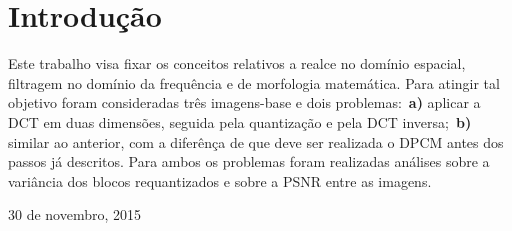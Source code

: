 \documentclass[conference]{Trabalho_3}
\begin{document}
\maketitle






%
\IEEEpeerreviewmaketitle


\section{Introdu\c{c}\~ao}
  \label{intro}
Este trabalho visa fixar os conceitos relativos a realce no dom\'inio espacial, filtragem no dom\'inio da frequ\^encia e de morfologia matem\'atica. Para atingir tal objetivo foram consideradas tr\^es imagens-base e dois problemas:~\textbf{a)} aplicar a DCT em duas dimens\~oes, seguida pela quantiza\c{c}\~ao e pela DCT inversa;~\textbf{b)} similar ao anterior, com a difer\^en\c{c}a de que deve ser realizada o DPCM antes dos passos j\'a descritos. Para ambos os problemas foram realizadas an\'alises sobre a vari\^ancia dos blocos requantizados e sobre a PSNR entre as imagens.
 
\hfill 30 de novembro, 2015


%
%
\end{document}
